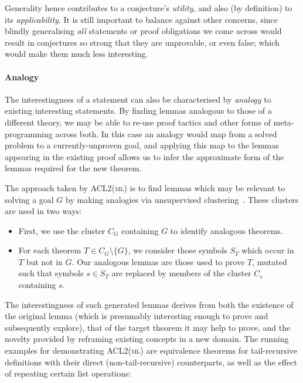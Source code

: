 Generality hence contributes to a conjecture's \emph{utility}, and also (by
definition) to its \emph{applicability}. It is still important to balance
against other concerns, since blindly generalising \emph{all} statements or
proof obligations we come across would result in conjectures so strong that they
are unprovable, or even false; which would make them much less interesting.

\paragraph{Analogy}

The interestingness of a statement can also be characterised by \emph{analogy}
to existing interesting statements. By finding lemmas analogous to those of a
different theory, we may be able to re-use proof tactics and other forms of
meta-programming across both. In this case an analogy would map from a solved
problem to a currently-unproven goal, and applying this map to the lemmas
appearing in the existing proof allows us to infer the approximate form of the
lemmas required for the new theorem.

The approach taken by \textsc{ACL2(ml)} is to find lemmas which may be relevant
to solving a goal $G$ by making analogies via unsupervised
clustering~\cite{Heras.Komendantskaya.Johansson.ea:2013}. These clusters are
used in two ways:

\begin{itemize}
\item First, we use the cluster $C_G$ containing $G$ to identify analogous
  theorems.

\item For each theorem $T \in C_G \setminus \{G\}$, we consider those symbols
  $S_T$ which occur in $T$ but not in $G$. Our analogous lemmas are those used
  to prove $T$, mutated such that symbols $s \in S_T$ are replaced by members of
  the cluster $C_s$ containing $s$.
\end{itemize}

The interestingness of such generated lemmas derives from both the existence of
the original lemma (which is presumably interesting enough to prove and
subsequently explore), that of the target theorem it may help to prove, and the
novelty provided by reframing existing concepts in a new domain. The running
examples for demonstrating \textsc{ACL2(ml)} are equivalence theorems for
tail-recursive definitions with their direct (non-tail-recursive) counterparts,
as well as the effect of repeating certain list operations:


